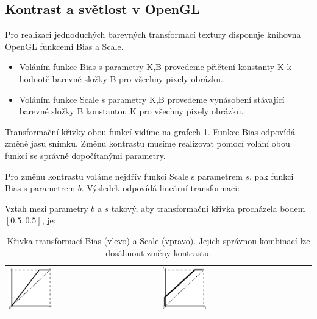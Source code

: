 \newpage
\subsection{Kontrast a světlost v OpenGL}
Pro realizaci jednoduchých barevných transformací textury disponuje knihovna OpenGL funkcemi Bias a Scale.

\begin{itemize}
\item Voláním funkce Bias s parametry K,B provedeme přičtení konstanty K k hodnotě barevné složky B pro všechny pixely obrázku.
\item Voláním funkce Scale s parametry K,B provedeme vynásobení stávající barevné složky B konstantou K pro všechny pixely obrázku.
\end{itemize}

Transformační křivky obou funkcí vidíme na grafech \ref{table:biasscale}. Funkce Bias odpovídá změně jasu snímku. Změnu kontrastu musíme realizovat pomocí volání obou funkcí se správně dopočítanými parametry.

Pro změnu kontrastu voláme nejdřív funkci Scale s parametrem $s$, pak funkci Bias s parametrem $b$. Výsledek odpovídá lineární transformaci:
 

Vztah mezi parametry $b$ a $s$ takový, aby transformační křivka procházela bodem $[0.5,0.5]$, je:


\noindent
\begin{table}[ht]
	\captionsetup{tablename=Grafy}
	\caption{Křivka transformací Bias (vlevo) a Scale (vpravo). Jejich správnou kombinací lze dosáhnout změny kontrastu.}
	\label{table:biasscale}
	\centering
		\begin{tabular}{p{}p{}}
			\includegraphics[width=0.3\textwidth]{Text/IMG/Bias.png}
		&
			\includegraphics[width=0.3\textwidth]{Text/IMG/Scale.png}
		\end{tabular}

\end{table}

